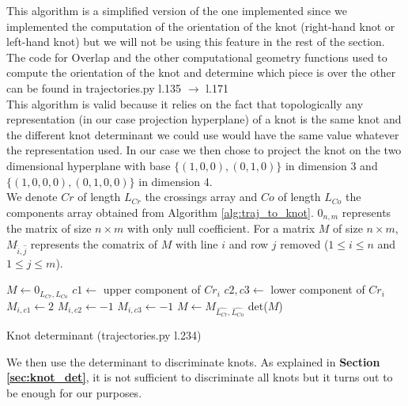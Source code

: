 \documentclass[12pt, a4paper]{article}
\begin{document}
This algorithm is a simplified version of the one implemented since we implemented the computation of the orientation of the knot (right-hand knot or left-hand knot) but we will not be using this feature in the rest of the section. The code for {\selectfont Overlap} and the other computational geometry functions used to compute the orientation of the knot and determine which piece is over the other can be found in {\selectfont trajectories.py l.135 $\to$ l.171}\\

This algorithm is valid because it relies on the fact that topologically any representation (in our case projection hyperplane) of a knot is the same knot and the different knot determinant we could use would have the same value whatever the representation used. In our case we then chose to project the knot on the two dimensional hyperplane with base $\{(1,0,0), (0,1,0)\}$ in dimension 3 and $\{(1,0,0,0), (0,1,0,0)\}$ in dimension 4.\\  

We denote $Cr$ of length $L_{Cr}$ the crossings array and $Co$ of length $L_{Co}$ the components array obtained from Algorithm \ref{alg:traj_to_knot}. $0_{n,m}$ represents the matrix of size $n \times m$ with only null coefficient. For a matrix $M$ of size $n \times m$, $M_{\widehat{i},\widehat{j}}$ represents the comatrix of $M$ with line $i$ and row $j$ removed ($1 \le i \le n$ and $1 \le j \le m$).

\begin{algorithm}[H]
  \begin{algorithmic}[1]
    \ENDIF
    \STATE $M \gets 0_{L_{Cr},L_{Co}}$
    \STATE $c1 \gets$ upper component of $Cr_i$
    \STATE $c2,c3 \gets$ lower component of $Cr_i$
    \STATE $M_{i,c1} \gets 2$
    \STATE $M_{i,c2} \gets -1$
    \STATE $M_{i,c3} \gets -1$
    \ENDFOR
    \STATE $M \gets M_{\widehat{L_{Cr}}, \widehat{L_{Co}}}$
    \RETURN det($M$)
  \end{algorithmic}
  \caption{Knot determinant ({\selectfont trajectories.py l.234})}
  \label{alg:knot_det}
\end{algorithm}

We then use the determinant to discriminate knots. As explained in \textbf{Section \ref{sec:knot_det}}, it is not sufficient to discriminate all knots but it turns out to be enough for our purposes. 
\end{document}
